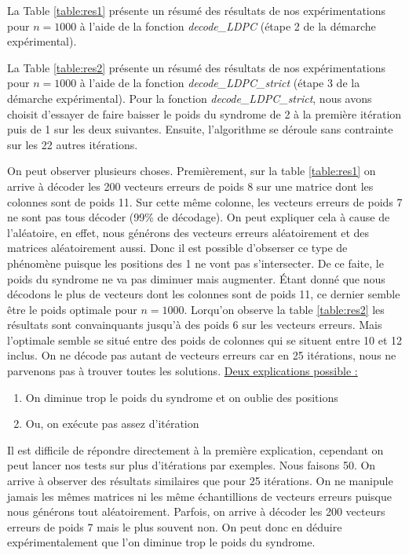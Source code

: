 \documentclass[french,nochapter,11pt]{rapportUB}
\begin{document}
La Table \ref{table:res1} présente un résumé des résultats de nos expérimentations pour $n=1000$ à l'aide de la fonction
\textit{decode\_LDPC} (étape 2 de la démarche expérimental). 

La Table \ref{table:res2} présente un résumé des résultats de nos expérimentations pour $n=1000$ à l'aide de la fonction
\textit{decode\_LDPC\_strict} (étape 3 de la démarche expérimental). 
Pour la fonction \textit{decode\_LDPC\_strict}, nous avons choisit d'essayer de faire baisser le poids du syndrome de 2 à la première itération puis de 1 sur les 
deux suivantes. Ensuite, l'algorithme se déroule sans contrainte sur les 22 autres itérations.

\vspace{0.4cm}
On peut observer plusieurs choses. Premièrement, sur la table \ref{table:res1} on arrive à décoder les 200 vecteurs erreurs de poids 
8 sur une matrice dont les colonnes sont de poids 11. Sur cette même colonne, les vecteurs erreurs de poids 7 ne sont pas tous décoder (99\% de décodage).
On peut expliquer cela à cause de l'aléatoire, en effet, nous générons des vecteurs erreurs aléatoirement et des matrices aléatoirement aussi.
Donc il est possible d'obserser ce type de phénomène puisque les positions des 1 ne vont pas s'intersecter. De ce faite,
le poids du syndrome ne va pas diminuer mais augmenter.\newline
Étant donné que nous décodons le plus de vecteurs dont les colonnes sont de poids 11, ce dernier semble être le poids optimale
pour $n = 1000$. Lorqu'on observe la table \ref{table:res2} les résultats sont convainquants jusqu'à des poids 6 sur les vecteurs erreurs.
Mais l'optimale semble se situé entre des poids de colonnes qui se situent entre 10 et 12 inclus. On ne décode pas autant de vecteurs erreurs
car en 25 itérations, nous ne parvenons pas à trouver toutes les solutions.
\clearpage
\underline{Deux explications possible :}
\begin{enumerate}
  \item On diminue trop le poids du syndrome et on oublie des positions
  \item Ou, on exécute pas assez d'itération
\end{enumerate}

Il est difficile de répondre directement à la première explication, cependant on peut lancer nos tests sur plus d'itérations par exemples.
Nous faisons 50. On arrive à observer des résultats similaires que pour 25 itérations. On ne manipule jamais les mêmes matrices ni les même échantillions de vecteurs erreurs
puisque nous générons tout aléatoirement. Parfois, on arrive à décoder les 200 vecteurs erreurs de poids 7 mais le plus souvent non.
On peut donc en déduire expérimentalement que l'on diminue trop le poids du syndrome.\vspace{0.4cm}\newline
\end{document}
